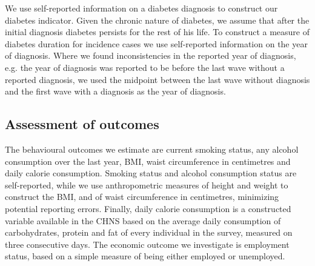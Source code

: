 We use self-reported information on a diabetes diagnosis to construct our diabetes indicator. Given the chronic nature of diabetes, we assume that after the initial diagnosis diabetes persists for the rest of his life. To construct a measure of diabetes duration for incidence cases we use self-reported information on the year of diagnosis. Where we found inconsistencies in the reported year of diagnosis, e.g. the year of diagnosis was reported to be before the last wave without a reported diagnosis, we used the midpoint between the last wave without diagnosis and the first wave with a diagnosis as the year of diagnosis. 

\subsection*{Assessment of outcomes}

The behavioural outcomes we estimate are current smoking status, any alcohol consumption over the last year, \ac{BMI}, waist circumference in centimetres and daily calorie consumption. Smoking status and alcohol consumption status are self-reported, while we use anthropometric measures of height and weight to construct the \ac{BMI}, and of waist circumference in centimetres, minimizing potential reporting errors. Finally, daily calorie consumption is a constructed variable available in the \ac{CHNS} based on the average daily consumption of carbohydrates, protein and fat of every individual in the survey, measured on three consecutive days. The economic outcome we investigate is employment status, based on a simple measure of being either employed or unemployed.


